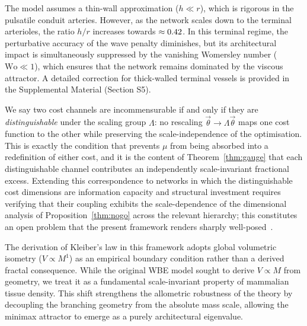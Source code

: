 \begin{remark}
The model assumes a thin-wall approximation ($h \ll r$), which is rigorous in
the pulsatile conduit arteries. However, as the network scales down to the
terminal arterioles, the ratio $h/r$ increases towards $\approx
0.42$. In this terminal regime, the perturbative
accuracy of the wave penalty diminishes, but its architectural impact is
simultaneously suppressed by the vanishing Womersley number ($\mathrm{Wo} \ll
1$), which ensures that the network remains dominated by the viscous attractor.
A detailed correction for thick-walled terminal vessels is provided in the
Supplemental Material (Section S5).
\end{remark}

\begin{remark}
\label{rem:incommensurability}
We say two cost channels are incommensurable if and only if they are
\emph{distinguishable} under the scaling group $\Lambda$: no rescaling
$\vec{\theta}\to\Lambda\vec{\theta}$ maps one cost function to the other while
preserving the scale-independence of the optimisation. This is exactly the
condition that prevents $\mu$ from being absorbed into a redefinition of either
cost, and it is the content of Theorem~\ref{thm:gauge} that each distinguishable
channel contributes an independently scale-invariant fractional excess.
Extending this correspondence to networks in which the distinguishable cost
dimensions are information capacity and structural investment requires verifying
that their coupling exhibits the scale-dependence of the dimensional analysis of
Proposition~\ref{thm:nogo} across the relevant hierarchy; this constitutes an
open problem that the present framework renders sharply
well-posed~\cite{bennett2025a, bennett2025b}.
\end{remark}

\begin{remark}
The derivation of Kleiber's law in this framework adopts global volumetric
isometry ($V \propto M^1$) as an empirical boundary condition rather than a
derived fractal consequence. While the original WBE model sought to derive $V
\propto M$ from geometry, we treat it as a fundamental scale-invariant property
of mammalian tissue density. This shift strengthens the allometric robustness of
the theory by decoupling the branching geometry from the absolute mass scale,
allowing the minimax attractor to emerge as a purely architectural eigenvalue.
\end{remark}

